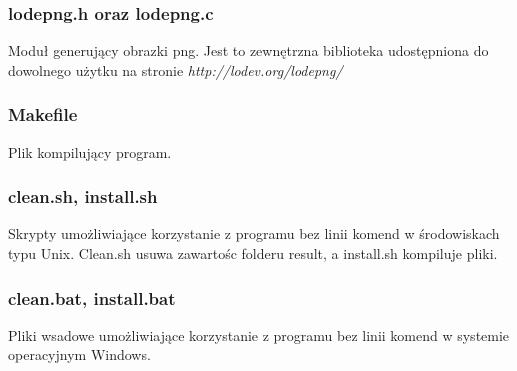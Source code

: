\documentclass{article}
\begin{document}
\subsubsection*{lodepng.h oraz lodepng.c}
Moduł generujący obrazki png. Jest to zewnętrzna biblioteka udostępniona do dowolnego użytku na stronie\emph{ http://lodev.org/lodepng/}
\subsubsection*{Makefile}
Plik kompilujący program.
\subsubsection*{clean.sh, install.sh}
Skrypty umożliwiające korzystanie z programu bez linii komend w środowiskach typu Unix. Clean.sh usuwa zawartośc folderu result, a install.sh kompiluje pliki.
\subsubsection*{clean.bat, install.bat}
Pliki wsadowe umożliwiające korzystanie z programu bez linii komend w systemie operacyjnym Windows.

  
\end{document}
